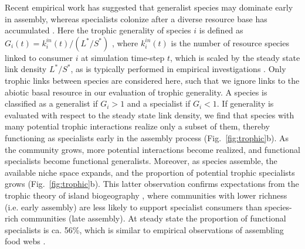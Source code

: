 \documentclass[twocolumn,preprintnumbers,amsmath,amssymb,superscriptaddress,linenumbers]{revtex4-1}
\begin{document}
Recent empirical work has suggested that generalist species may dominate early in assembly, whereas specialists colonize after a diverse resource base has accumulated \cite{Piechnik2008,Gravel2011}.
Here the trophic generality of species $i$ is defined as $G_i(t) = k_i^{in}(t)/(L^*/S^*)$ \cite{Williams2000}, where $k_i^{in}(t)$ is the number of resource species linked to consumer $i$ at simulation time-step $t$, which is scaled by the steady state link density $L^*/S^*$, as is typically performed in empirical investigations \cite{Piechnik2008}.
Only trophic links between species are considered here, such that we ignore links to the abiotic basal resource in our evaluation of trophic generality.
A species is classified as a generalist if $G_i > 1$ and a specialist if $G_i < 1$.
If generality is evaluated with respect to the steady state link density, we find that species with many potential trophic interactions realize only a subset of them, thereby functioning as specialists early in the assembly process (Fig.\ \ref{fig:trophic}b).
As the community grows, more potential interactions become realized, and functional specialists become functional generalists.
Moreover, as species assemble, the available niche space expands, and the proportion of potential trophic specialists grows (Fig.\ \ref{fig:trophic}b).
This latter observation confirms expectations from the trophic theory of island biogeography \cite{Gravel2011}, where communities with lower richness (i.e. early assembly) are less likely to support specialist consumers than species-rich communities (late assembly).
At steady state the proportion of functional specialists is ca. 56\%, which is similar to empirical observations of assembling food webs \cite{Piechnik2008}.
\end{document}
